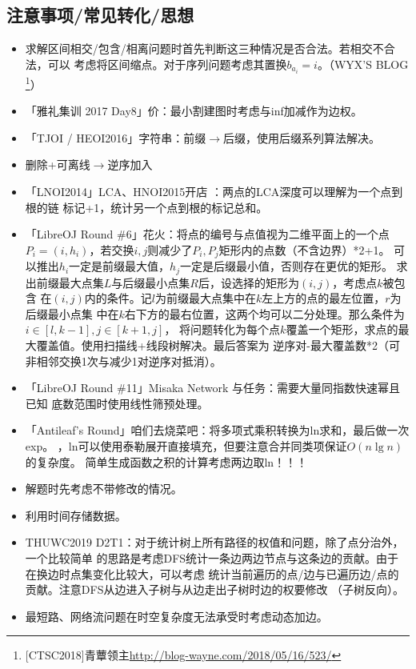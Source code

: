 \subsection{注意事项/常见转化/思想}
\begin{itemize}
	\item 求解区间相交/包含/相离问题时首先判断这三种情况是否合法。若相交不合法，可以
	      考虑将区间缩点。对于序列问题考虑其置换$b_{a_i}=i$。（WYX'S BLOG
	      \footnote{[CTSC2018]青蕈领主\url{http://blog-wayne.com/2018/05/16/523/}}）
	\item 「雅礼集训 2017 Day8」价：最小割建图时考虑与inf加减作为边权。
	\item 「TJOI / HEOI2016」字符串：前缀$\rightarrow$后缀，使用后缀系列算法解决。
	\item 删除+可离线$\rightarrow$逆序加入
	\item 「LNOI2014」LCA、HNOI2015开店 ：两点的LCA深度可以理解为一个点到根的链
	      标记+1，统计另一个点到根的标记总和。
	\item 「LibreOJ Round \#6」花火：将点的编号与点值视为二维平面上的一个点
	      $P_i=(i,h_i)$，若交换$i,j$则减少了$P_i,P_j$矩形内的点数（不含边界）*2+1。
	      可以推出$h_i$一定是前缀最大值，$h_j$一定是后缀最小值，否则存在更优的矩形。
	      求出前缀最大点集$L$与后缀最小点集$R$后，设选择的矩形为$(i,j)$，考虑点$k$被包含
	      在$(i,j)$内的条件。记$l$为前缀最大点集中在$k$左上方的点的最左位置，$r$为后缀最小点集
	      中在$k$右下方的最右位置，这两个均可以二分处理。那么条件为$i\in [l,k-1],j\in [k+1,j]$，
	      将问题转化为每个点$k$覆盖一个矩形，求点的最大覆盖值。使用扫描线+线段树解决。最后答案为
	      逆序对-最大覆盖数*2（可非相邻交换1次与减少1对逆序对抵消）。
	\item 「LibreOJ Round \#11」Misaka Network 与任务：需要大量同指数快速幂且已知
	      底数范围时使用线性筛预处理。
	\item 「Antileaf's Round」咱们去烧菜吧：将多项式乘积转换为ln求和，最后做一次exp。
		  ，ln可以使用泰勒展开直接填充，但要注意合并同类项保证$O(n\lg n)$的复杂度。
		  简单生成函数之积的计算考虑两边取ln！！！
	\item 解题时先考虑不带修改的情况。
	\item 利用时间存储数据。
	\item THUWC2019 D2T1：对于统计树上所有路径的权值和问题，除了点分治外，一个比较简单
	      的思路是考虑DFS统计一条边两边节点与这条边的贡献。由于在换边时点集变化比较大，可以考虑
	      统计当前遍历的点/边与已遍历边/点的贡献。注意DFS从边进入子树与从边走出子树时边的权要修改
	      （子树反向）。
	\item 最短路、网络流问题在时空复杂度无法承受时考虑动态加边。

\end{itemize}
